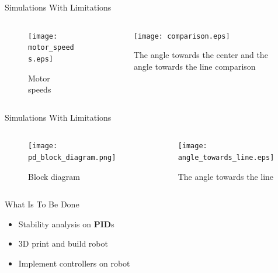 \documentclass{beamer}
\begin{document}





\begin{frame}{Simulations With Limitations}
\begin{columns}
\begin{column}[]{0.5\textwidth}
\begin{figure}
    \centering
    \texttt{[image: motor\_speeds.eps]}
    \caption{Motor speeds}
    \label{fig:my_label}
\end{figure}
\end{column}
\begin{column}[]{0.5\textwidth}
\begin{figure}
    \centering
    \texttt{[image: comparison.eps]}
    \caption{The angle towards the center and the angle towards the line comparison}
    \label{fig:my_label}
\end{figure}
\end{column}
\end{columns}
    
\end{frame}






\begin{frame}{Simulations With Limitations}

\begin{columns}
\begin{column}[]{0.5\textwidth}
\begin{figure}
    \centering
    \texttt{[image: pd\_block\_diagram.png]}
    \caption{Block diagram}
    \label{fig:my_label}
\end{figure}
\end{column}
\begin{column}[]{0.5\textwidth}
\begin{figure}
    \centering
    \texttt{[image: angle\_towards\_line.eps]}
    \caption{The angle towards the line}
    \label{fig:my_label}
\end{figure}
\end{column}
\end{columns}
\end{frame}

\begin{frame}{What Is To Be Done}
    \begin{itemize}
        \item Stability analysis on \textbf{PID}s
        \item 3D print and build robot
        \item Implement controllers on robot
    \end{itemize}
\end{frame}
\end{document}
